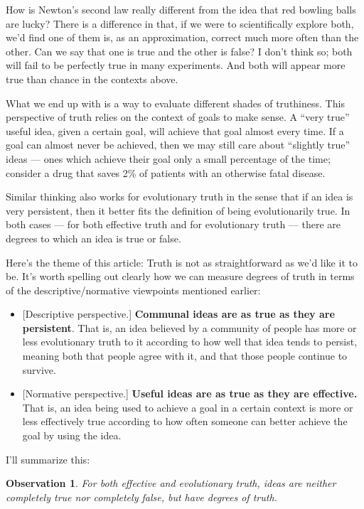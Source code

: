 \documentclass[11pt, oneside]{article}   	%
\newtheorem{obs}{Observation}
\begin{document}
How is Newton's second law really different from the idea that red bowling balls
are
lucky? There is a difference in that, if we were to scientifically explore both,
we'd find one of them is, as an approximation, correct much more often than the
other. Can we say that one is true and the other is false? I don't think so;
both will fail to be perfectly true in many experiments. And both will appear
more true than chance in the contexts above.

What we end up with is a way to evaluate different shades of truthiness.
This perspective of truth relies on the context of goals to make sense.
A ``very true'' useful idea, given
a certain goal, will achieve that goal almost every time. If a goal can
almost never be achieved, then we may still care about ``slightly true'' ideas
--- ones which achieve their goal only a small percentage of the time;
consider a drug that saves 2\% of patients with an otherwise fatal disease.

Similar thinking also works for evolutionary truth in the sense that if an idea
is very persistent, then it better fits the definition of being evolutionarily
true. In both cases --- for both effective truth and for evolutionary truth ---
there are degrees to which an idea is true or false.

Here's the theme of this article:
Truth is not as straightforward as we'd like it to be.
It's worth spelling out clearly how we can measure degrees of truth in terms of
the descriptive/normative viewpoints mentioned earlier:
\begin{itemize}
    \item{} [Descriptive perspective.]
        {\bf Communal ideas are as true as they are
        persistent}.
        That is, an idea believed by a community of people has
        more or less evolutionary truth to it according to how well that
        idea tends to persist, meaning both that people agree with it, and
        that those people continue to survive.
    \item{} [Normative perspective.]
        {\bf Useful ideas are as true as they are effective.}
        That is, an idea being used to achieve a goal in a certain context
        is more or less effectively true according to how often someone can
        better achieve the goal by using the idea.
\end{itemize}

I'll summarize this:
\begin{obs}\label{o2}
    For both
    effective and evolutionary truth,
    ideas are neither completely true nor completely false, but have degrees of
    truth.
\end{obs}
\end{document}
